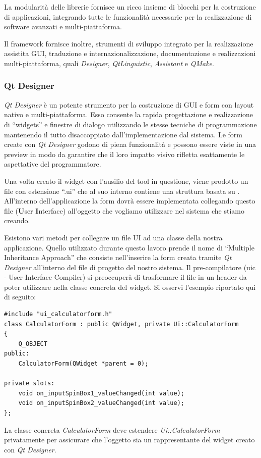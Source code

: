 La modularità delle librerie \qt{} fornisce un ricco insieme di blocchi per la costruzione di applicazioni, integrando tutte le funzionalità necessarie per la realizzazione di software avanzati e multi-piattaforma.

Il framework fornisce inoltre, strumenti di sviluppo integrato per la realizzazione assistita GUI, traduzione e internazionalizzazione, documentazione e realizzazioni multi-piattaforma, quali \emph{Designer}, \emph{QtLinguistic}, \emph{Assistant} e \emph{QMake}.

\subsubsection{Qt Designer}
\emph{Qt Designer} è un potente strumento per la costruzione di GUI e form con layout nativo e multi-piattaforma. Esso consente la rapida progettazione e realizzazione di ``widgets'' e finestre di dialogo utilizzando le stesse tecniche di programmazione mantenendo il tutto disaccoppiato dall'implementazione dal sistema. Le form create con \emph{Qt Designer} godono di piena funzionalità e possono essere viste in una preview in modo da garantire che il loro impatto visivo rifletta esattamente le aspettative del programmatore.

Una volta creato il widget con l'ausilio del tool in questione, viene prodotto un file con estensione ``.ui'' che al suo interno contiene una struttura basata su \xml{}. All'interno dell'applicazione la form dovrà essere implementata collegando questo file (\textbf{U}ser \textbf{I}nterface) all'oggetto che vogliamo utilizzare nel sistema che stiamo creando.

Esistono vari metodi per collegare un file UI ad una classe della nostra applicazione. Quello utilizzato durante questo lavoro prende il nome di ``Multiple Inheritance Approach'' che consiste nell'inserire la form creata tramite \emph{Qt Designer} all'interno del file di progetto del nostro sistema. Il pre-compilatore (uic - User Interface Compiler) si preoccuperà di trasformare il file \xml{} in un header \cpp{} da poter utilizzare nella classe concreta del widget. Si osservi l'esempio riportato qui di seguito:
\begin{lstlisting}
#include "ui_calculatorform.h"
class CalculatorForm : public QWidget, private Ui::CalculatorForm
{
    Q_OBJECT
public:
    CalculatorForm(QWidget *parent = 0);

private slots:
    void on_inputSpinBox1_valueChanged(int value);
    void on_inputSpinBox2_valueChanged(int value);
};
\end{lstlisting}
La classe concreta \emph{CalculatorForm} deve estendere \emph{Ui::CalculatorForm} privatamente per assicurare che l'oggetto sia un rappresentante del widget creato con \emph{Qt Designer}.


